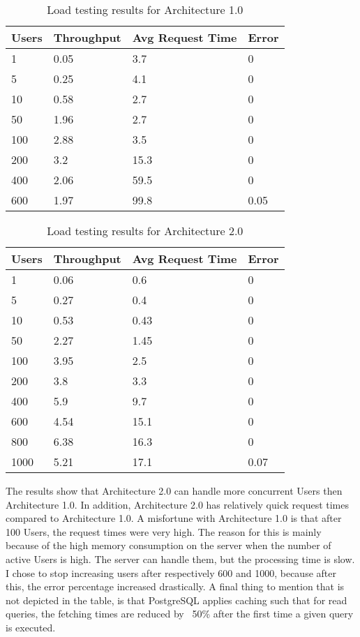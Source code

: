 \begin{table}
\begin{center}
    \begin{tabular}{| l | l | l | l |}
    \hline
	Users & Throughput & Avg Request Time & Error \\ \hline
	1 & 0.05 & 3.7 & 0 \\ \hline
	5 & 0.25 & 4.1 & 0 \\ \hline
	10 & 0.58 & 2.7 & 0 \\ \hline
       50 & 1.96 & 2.7 & 0 \\ \hline
	100 & 2.88 & 3.5 & 0 \\ \hline
	200 & 3.2 & 15.3 & 0 \\ \hline
       400 & 2.06 & 59.5 & 0 \\ \hline
	600 & 1.97 & 99.8 & 0.05 \\ \hline
    \end{tabular}
	\label{load1}
    \caption{Load testing results for Architecture 1.0}
\end{center}
\end{table}

\begin{table}
\begin{center}
    \begin{tabular}{| l | l | l | l |}
    \hline
	Users & Throughput & Avg Request Time & Error \\ \hline
	1 & 0.06 & 0.6 & 0 \\ \hline
	5 & 0.27 & 0.4 & 0 \\ \hline
	10 & 0.53 & 0.43 & 0 \\ \hline
       50 & 2.27 & 1.45 & 0 \\ \hline
	100 & 3.95 & 2.5 & 0 \\ \hline
	200 & 3.8 & 3.3 & 0 \\ \hline
       400 & 5.9 & 9.7 & 0 \\ \hline
	600 & 4.54 & 15.1 & 0 \\ \hline
	800 & 6.38 & 16.3 & 0 \\ \hline
	1000 & 5.21 & 17.1 & 0.07 \\ \hline
    \end{tabular}
    	\label{load2}
        \caption{Load testing results for Architecture 2.0}
\end{center}
\end{table}
The results show that Architecture 2.0 can handle more concurrent Users then Architecture 1.0. In addition, Architecture 2.0 has relatively quick request times compared to Architecture 1.0. A misfortune with Architecture 1.0 is that after 100 Users, the request times were very high. The reason for this is mainly because of the high memory consumption on the server when the number of active Users is high.   The server can handle them, but the processing time is slow. I chose to stop increasing users after respectively 600 and 1000, because after this, the error percentage increased drastically. A final thing to mention that is not depicted in the table, is that PostgreSQL applies caching such that for read queries, the fetching times are reduced by ~50\% after the first time a given query is executed. 

